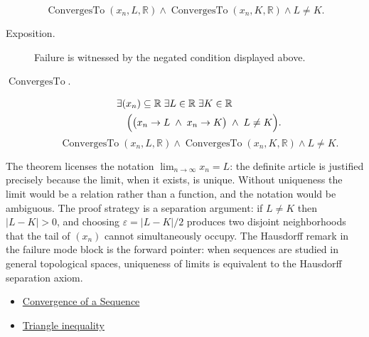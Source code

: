 \begin{remark*}
\[
\operatorname{ConvergesTo}(x_n,L,\mathbb{R})
\land
\operatorname{ConvergesTo}(x_n,K,\mathbb{R})
\land L\neq K.
\]
\end{remark*}
\begin{remark*}
\begin{description}
  \item[Exposition.]
Failure is witnessed by the negated condition displayed above.
  \item[\(\operatorname{ConvergesTo}.\)]
\[
\begin{aligned}
&\exists (x_n) \subseteq \mathbb{R} \;\exists L \in \mathbb{R}
\;\exists K \in \mathbb{R}\\
&\quad\Bigl(
    \bigl(x_n \to L \;\land\; x_n \to K\bigr)
    \;\land\;
    L \neq K
\Bigr).
\end{aligned}
\]
\[
\operatorname{ConvergesTo}(x_n,L,\mathbb{R})
\land
\operatorname{ConvergesTo}(x_n,K,\mathbb{R})
\land L\neq K.
\]
\end{description}
\end{remark*}

\begin{remark*}[Interpretation]
The theorem licenses the notation $\displaystyle\lim_{n \to \infty} x_n
= L$: the definite article is justified precisely because the limit,
when it exists, is unique. Without uniqueness the limit would be a
relation rather than a function, and the notation would be ambiguous.
The proof strategy is a separation argument: if $L \neq K$ then
$|L - K| > 0$, and choosing $\varepsilon = |L - K|/2$ produces two
disjoint neighborhoods that the tail of $(x_n)$ cannot simultaneously
occupy. The Hausdorff remark in the failure mode block is the forward
pointer: when sequences are studied in general topological spaces,
uniqueness of limits is equivalent to the Hausdorff separation axiom.
\end{remark*}

\begin{dependencies}
\begin{itemize}
  \item \hyperref[def:convergent-sequence]{Convergence of a Sequence}
  \item \hyperref[thm:triangle-inequality]{Triangle inequality}
\end{itemize}
\end{dependencies}


